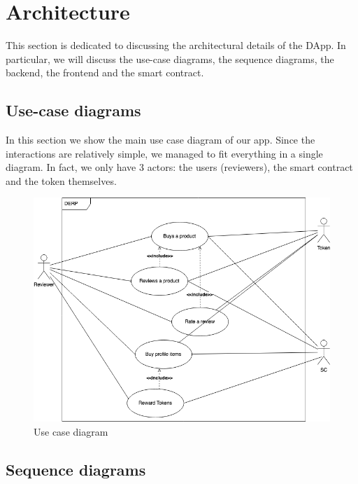 \documentclass[12pt,a4paper,oneside]{article}
\theoremstyle{definition}
\begin{document}
\newpage
\section{Architecture}

This section is dedicated to discussing the architectural details of the DApp. In particular, we will discuss the use-case diagrams, the sequence diagrams, the backend, the frontend and the smart contract. 

\subsection{Use-case diagrams}


In this section we show the main use case diagram of our app. Since the interactions are relatively simple, we managed to fit everything in a single diagram. In fact, we only have 3 actors: the users (reviewers), the smart contract and the token themselves.

\begin{figure}[ht]
	\centering
	\includegraphics[scale=0.5]{figures/uc_drawio.png}
	\caption{Use case diagram}
	\label{fig:use_case}
\end{figure}

\subsection{Sequence diagrams}
\end{document}
